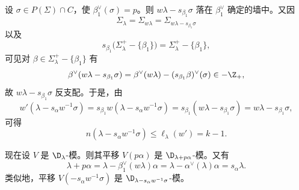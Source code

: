 设 $\sigma\in P(\Sigma)\cap C$，使 $\beta_1^\vee(\sigma)=p$。则 $w\lambda-s_{\beta_1}\sigma$ 落在 $\beta_1^\vee$ 确定的墙中。又因
$$\Sigma_\lambda=\Sigma_{w\lambda}=\Sigma_{w\lambda-s_{\beta_1}\sigma}$$
以及
$$s_{\beta_1}\bigl(\Sigma_\lambda^+-\{\beta_1\}\bigr)=\Sigma_\lambda^+-\{\beta_1\},$$
可见对 $\beta\in\Sigma_\lambda^+-\{\beta_1\}$ 有
$$\beta^\vee(w\lambda-s_{\beta_1}\sigma)=\beta^\vee(w\lambda)-(s_{\beta_1}\beta)^\vee(\sigma)\in-\Z_+,$$
故 $w\lambda-s_{\beta_1}\sigma$ 反支配。于是，由
$$w'(\lambda-s_\alpha w^{-1}\sigma)=s_{\beta_1}w(\lambda-s_\alpha w^{-1}\sigma)=s_{\beta_1}(w\lambda-s_{\beta_1}\sigma)=w\lambda-s_{\beta_1}\sigma,$$
可得
$$n(\lambda-s_\alpha w^{-1}\sigma)\le\ell_\lambda(w')=k-1.$$

现在设 $V$ 是 $\D_\lambda$-模。则其平移 $V(p\alpha)$ 是 $\D_{\lambda+p\alpha}$-模。又有
$$\lambda+p\alpha=\lambda-\beta_1^\vee(w\lambda)\alpha=\lambda-\alpha^\vee(\lambda)\alpha=s_\alpha\lambda.$$
类似地，平移 $V(-s_\alpha w^{-1}\sigma)$ 是 $\D_{\lambda-s_\alpha w^{-1}\sigma}$-模。

